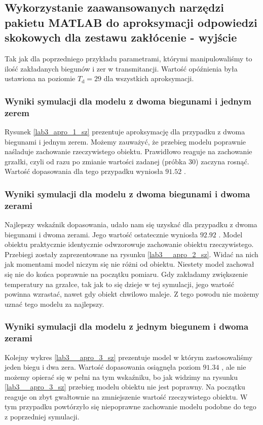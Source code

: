 \subsection{Wykorzystanie zaawansowanych narzędzi pakietu MATLAB do aproksymacji odpowiedzi skokowych dla zestawu zakłócenie - wyjście}
Tak jak dla poprzedniego przykładu parametrami, którymi manipulowaliśmy to ilość zakładanych biegunów i zer w transmitancji. Wartość opóźnienia była ustawiona na poziomie $T_{\mathrm{d}}=29$ dla wszystkich aproksymacji. 

\subsubsection{Wyniki symulacji dla modelu z dwoma biegunami i jednym zerem}
Rysunek \ref{lab3_apro_1_sz} prezentuje aproksymację dla przypadku z dwoma biegunami i jednym zerem. Możemy zauważyć, że przebieg modelu poprawnie naśladuje zachowanie rzeczywistego obiektu. Prawidłowo reaguje na zachowanie grzałki, czyli od razu po zmianie wartości zadanej (próbka 30) zaczyna rosnąć. Wartość dopasowania dla tego przypadku wyniosła $\num{91,52}$ \text{\%}.

\subsubsection{Wyniki symulacji dla modelu z dwoma biegunami i dwoma zerami}
Najlepszy wskaźnik dopasowania, udało nam się uzyskać dla przypadku z dwoma biegunami i dwoma zerami. Jego wartość ostatecznie wyniosła $\num{92,92}$ \text{\%}. Model obiektu praktycznie identycznie odwzorowuje zachowanie obiektu rzeczywistego. Przebiegi zostały zaprezentowane na rysunku \ref{lab3__apro_2_sz}. Widać na nich jak momentami model niczym się nie różni od obiektu. Niestety model zachował się nie do końca poprawnie na początku pomiaru. Gdy zakładamy zwiększenie temperatury na grzałce, tak jak to się dzieje w tej symulacji, jego wartość powinna wzrastać, nawet gdy obiekt chwilowo maleje. Z tego powodu nie możemy uznać tego modelu za najlepszy. 

\subsubsection{Wyniki symulacji dla modelu z jednym biegunem i dwoma zerami}
Kolejny wykres \ref{lab3__apro_3_sz} prezentuje model w którym zastosowaliśmy jeden biegu i dwa zera. Wartość dopasowania osiągnęła poziom $\num{91,34}$ \text{\%}, ale nie możemy opierać się w pełni na tym wskaźniku, bo jak widzimy na rysunku \ref{lab3__apro_3_sz} przebieg modelu obiektu nie jest poprawny. Na początku reaguje on zbyt gwałtownie na zmniejszenie wartość rzeczywistego obiektu. W tym przypadku powtórzyło się niepoprawne zachowanie modelu podobne do tego z poprzedniej symulacji. 

